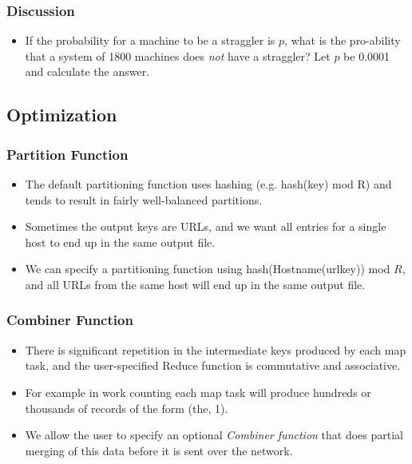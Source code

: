 \documentclass{beamer}
\begin{document}
\begin{frame}
  \frametitle{Discussion}
  \begin{itemize}
    \item If the probability for a machine to be a straggler is $p$,
      what is the pro-ability that a system of 1800 machines does {\em
        not} have a straggler?  Let $p$ be 0.0001 and calculate the
      answer.
  \end{itemize}
\end{frame}
  
\subsection{Optimization}

\begin{frame}
  \frametitle{Partition Function}
  \begin{itemize}
    \item The default partitioning function uses hashing
      (e.g. hash(key) mod R) and tends to result in fairly
      well-balanced partitions.
    \item Sometimes the output keys are URLs, and we want all entries
      for a single host to end up in the same output file. 
    \item We can specify a partitioning function using
      hash(Hostname(urlkey)) mod $R$, and all URLs from the same host
      will end up in the same output file.
  \end{itemize}
\end{frame}

\begin{frame}
  \frametitle{Combiner Function}
  \begin{itemize}
    \item There is significant repetition in the intermediate keys
      produced by each map task, and the user-specified Reduce
      function is commutative and associative.
    \item For example in work counting each map task will produce
      hundreds or thousands of records of the form (the, 1).
    \item We allow the user to specify an optional {\em Combiner
      function} that does partial merging of this data before it is
      sent over the network.
  \end{itemize}
\end{frame}
\end{document}
